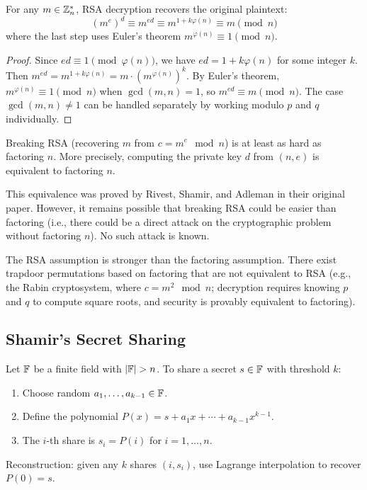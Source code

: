 \begin{theorem}
For any $m \in \mathbb{Z}_n^*$, RSA decryption recovers the original plaintext:
\[
(m^e)^d \equiv m^{ed} \equiv m^{1 + k\varphi(n)} \equiv m \pmod n
\]
where the last step uses Euler's theorem $m^{\varphi(n)} \equiv 1 \pmod n$.
\end{theorem}

\begin{proof}
Since $ed \equiv 1 \pmod{\varphi(n)}$, we have $ed = 1 + k\varphi(n)$ for some integer $k$. Then $m^{ed} = m^{1 + k\varphi(n)} = m \cdot (m^{\varphi(n)})^k$. By Euler's theorem, $m^{\varphi(n)} \equiv 1 \pmod n$ when $\gcd(m, n) = 1$, so $m^{ed} \equiv m \pmod n$. The case $\gcd(m, n) \neq 1$ can be handled separately by working modulo $p$ and $q$ individually.
\end{proof}

\begin{theorem}
Breaking RSA (recovering $m$ from $c = m^e \mod n$) is at least as hard as factoring $n$. More precisely, computing the private key $d$ from $(n, e)$ is equivalent to factoring $n$.
\end{theorem}

This equivalence was proved by Rivest, Shamir, and Adleman in their original paper. However, it remains possible that breaking RSA could be easier than factoring (i.e., there could be a direct attack on the cryptographic problem without factoring $n$). No such attack is known.

\begin{remark}
The RSA assumption is stronger than the factoring assumption. There exist trapdoor permutations based on factoring that are not equivalent to RSA (e.g., the Rabin cryptosystem, where $c = m^2 \mod n$; decryption requires knowing $p$ and $q$ to compute square roots, and security is provably equivalent to factoring).
\end{remark}

\subsection{Shamir's Secret Sharing}

\begin{definition}
Let $\mathbb{F}$ be a finite field with $|\mathbb{F}| > n$. To share a secret $s \in \mathbb{F}$ with threshold $k$:
\begin{enumerate}
    \item Choose random $a_1, \ldots, a_{k-1} \in \mathbb{F}$.
    \item Define the polynomial $P(x) = s + a_1 x + \cdots + a_{k-1} x^{k-1}$.
    \item The $i$-th share is $s_i = P(i)$ for $i = 1, \ldots, n$.
\end{enumerate}
Reconstruction: given any $k$ shares $(i, s_i)$, use Lagrange interpolation to recover $P(0) = s$.
\end{definition}

